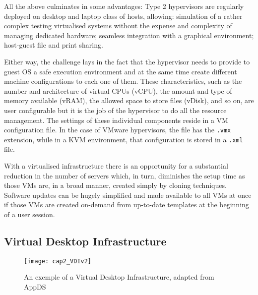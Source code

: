 \begin{description}
	All the above culminates in some advantages: Type 2 hypervisors are regularly deployed on desktop and laptop class of hosts, allowing: simulation of a rather complex testing virtualised systems without the expense and complexity of managing dedicated hardware; seamless integration with a graphical environment; host-guest file and print sharing.
\end{description}

Either way, the challenge lays in the fact that the hypervisor needs to provide to guest OS a safe execution environment and at the same time create different machine configurations to each one of them. These characteristics, such as the number and architecture of virtual CPUs (vCPU), the amount and type of memory available (vRAM), the allowed space to store files (vDisk), and so on, are user configurable but it is the job of the hypervisor to do all the resource management. The settings of these individual components reside in a VM configuration file. In the case of VMware hypervisors, the file has the \texttt{.vmx} extension,\cite{VMWare_VMFiles,Portnoy2012} while in a KVM environment, that configuration is stored in a \texttt{.xml} file.~\cite{chirammal2016}

With a virtualised infrastructure there is an opportunity for a substantial reduction in the number of servers which, in turn, diminishes the setup time as those VMs are, in a broad manner, created simply by cloning techniques. Software updates can be hugely simplified and made available to all VMs at once if those VMs are created on-demand from up-to-date templates at the beginning of a user session.



\subsection{Virtual Desktop Infrastructure} %
\label{sub:res_vdi}

\begin{figure}[htbp]
	\centering
	\texttt{[image: cap2\_VDIv2]}
	\caption[An exemple of a Virtual Desktop Infrastructure, adapted from AppDS]{An exemple of a Virtual Desktop Infrastructure, adapted from AppDS~\cite{appds_2017}}
	\label{fig:VDI}
\end{figure}

